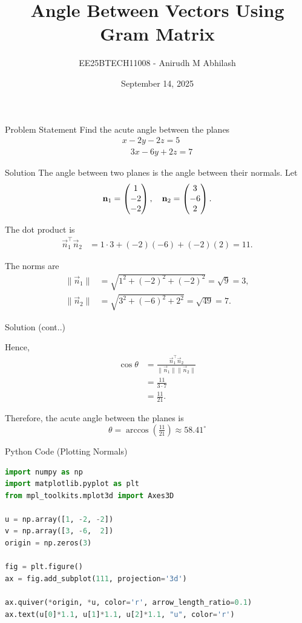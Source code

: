 \documentclass{beamer}
\title{Angle Between Vectors Using Gram Matrix}
\author{EE25BTECH11008 - Anirudh M Abhilash}
\date{September 14, 2025}
\begin{document}
\begin{frame}
\titlepage
\end{frame}

\begin{frame}{Problem Statement}
Find the acute angle between the planes 
\begin{align*}
x - 2y - 2z = 5 \\
\quad 3x - 6y + 2z = 7
\end{align*}
\end{frame}

\begin{frame}{Solution}
The angle between two planes is the angle between their normals.
Let
\[
\mathbf{n}_1 = \begin{pmatrix}1 \\ -2 \\ -2\end{pmatrix}, 
\quad \mathbf{n}_2 = \begin{pmatrix}3 \\ -6 \\ 2\end{pmatrix}.
\]

The dot product is
\begin{align}
\vec{n}_1^\top \vec{n}_2 &= 1\cdot 3 + (-2)(-6) + (-2)(2) = 11.
\end{align}

The norms are
\begin{align}
\|\vec{n}_1\| &= \sqrt{1^2 + (-2)^2 + (-2)^2} = \sqrt{9} = 3, \\
\|\vec{n}_2\| &= \sqrt{3^2 + (-6)^2 + 2^2} = \sqrt{49} = 7.
\end{align}
\end{frame}

\begin{frame}{Solution (cont..)}

Hence,
\begin{align}
\cos\theta &= \frac{\vec{n}_1^\top \vec{n}_2}{\|\vec{n}_1\|\|\vec{n}_2\|} \\
&= \frac{11}{3\cdot 7} \\
&= \frac{11}{21}.
\end{align}

Therefore, the acute angle between the planes is
\[
\boxed{\theta = \arccos\!\left(\tfrac{11}{21}\right) \approx 58.41^\circ}
\]
\end{frame}

\begin{frame}[fragile]{Python Code (Plotting Normals)}
\begin{lstlisting}[language=Python]
import numpy as np
import matplotlib.pyplot as plt
from mpl_toolkits.mplot3d import Axes3D

u = np.array([1, -2, -2])
v = np.array([3, -6,  2])
origin = np.zeros(3)

fig = plt.figure()
ax = fig.add_subplot(111, projection='3d')

ax.quiver(*origin, *u, color='r', arrow_length_ratio=0.1)
ax.text(u[0]*1.1, u[1]*1.1, u[2]*1.1, "u", color='r')
\end{lstlisting}
\end{frame}
\end{document}
